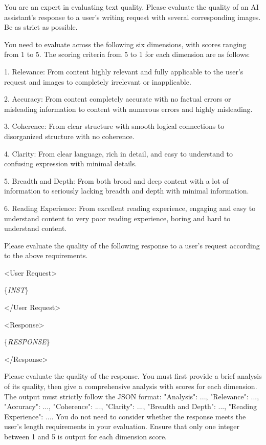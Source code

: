 \begin{tcolorbox}[size=title,opacityfill=0.05,breakable]
\noindent
You are an expert in evaluating text quality. Please evaluate the quality of an AI assistant's response to a user's writing request with several corresponding images. Be as strict as possible.

You need to evaluate across the following six dimensions, with scores ranging from 1 to 5. The scoring criteria from 5 to 1 for each dimension are as follows:

1. Relevance: From content highly relevant and fully applicable to the user's request and images to completely irrelevant or inapplicable.

2. Accuracy: From content completely accurate with no factual errors or misleading information to content with numerous errors and highly misleading.

3. Coherence: From clear structure with smooth logical connections to disorganized structure with no coherence.

4. Clarity: From clear language, rich in detail, and easy to understand to confusing expression with minimal details.

5. Breadth and Depth: From both broad and deep content with a lot of information to seriously lacking breadth and depth with minimal information.

6. Reading Experience: From excellent reading experience, engaging and easy to understand content to very poor reading experience, boring and hard to understand content.

Please evaluate the quality of the following response to a user's request according to the above requirements.

<User Request>

 \{\textit{INST}\}

</User Request>

<Response>

 \{\textit{RESPONSE}\}

</Response>

Please evaluate the quality of the response. You must first provide a brief analysis of its quality, then give a comprehensive analysis with scores for each dimension. The output must strictly follow the JSON format: {"Analysis": ..., "Relevance": ..., "Accuracy": ..., "Coherence": ..., "Clarity": ..., "Breadth and Depth": ..., "Reading Experience": ...}. You do not need to consider whether the response meets the user's length requirements in your evaluation. Ensure that only one integer between 1 and 5 is output for each dimension score.
\end{tcolorbox}


